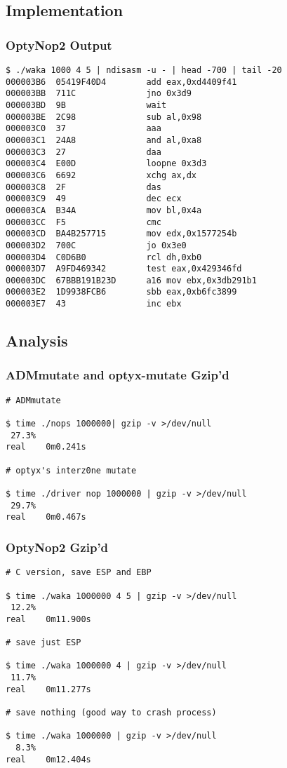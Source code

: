\documentclass{beamer}
\begin{document}
\subsection{Implementation}

\begin{frame}[fragile]
  \frametitle{OptyNop2 Output}
  {\footnotesize
  \begin{verbatim}
$ ./waka 1000 4 5 | ndisasm -u - | head -700 | tail -20
000003B6  05419F40D4        add eax,0xd4409f41
000003BB  711C              jno 0x3d9
000003BD  9B                wait
000003BE  2C98              sub al,0x98
000003C0  37                aaa
000003C1  24A8              and al,0xa8
000003C3  27                daa
000003C4  E00D              loopne 0x3d3
000003C6  6692              xchg ax,dx
000003C8  2F                das
000003C9  49                dec ecx
000003CA  B34A              mov bl,0x4a
000003CC  F5                cmc
000003CD  BA4B257715        mov edx,0x1577254b
000003D2  700C              jo 0x3e0
000003D4  C0D6B0            rcl dh,0xb0
000003D7  A9FD469342        test eax,0x429346fd
000003DC  67BBB191B23D      a16 mov ebx,0x3db291b1
000003E2  1D9938FCB6        sbb eax,0xb6fc3899
000003E7  43                inc ebx
\end{verbatim}
}
\end{frame}



\subsection{Analysis}

\begin{frame}[fragile]
  \frametitle{ADMmutate and optyx-mutate Gzip'd}
  {\footnotesize
  \begin{verbatim}
# ADMmutate

$ time ./nops 1000000| gzip -v >/dev/null
 27.3%
real    0m0.241s

# optyx's interz0ne mutate

$ time ./driver nop 1000000 | gzip -v >/dev/null
 29.7%
real    0m0.467s
\end{verbatim}
}
\end{frame}

\begin{frame}[fragile]
  \frametitle{OptyNop2 Gzip'd}
  {\footnotesize
  \begin{verbatim}
# C version, save ESP and EBP

$ time ./waka 1000000 4 5 | gzip -v >/dev/null
 12.2%
real    0m11.900s

# save just ESP

$ time ./waka 1000000 4 | gzip -v >/dev/null
 11.7%
real    0m11.277s

# save nothing (good way to crash process)

$ time ./waka 1000000 | gzip -v >/dev/null
  8.3%
real    0m12.404s
\end{verbatim}
}
\end{frame}
\end{document}
